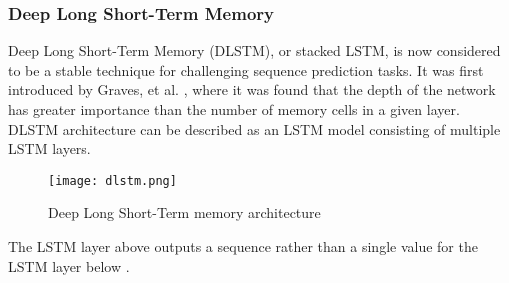 \subsubsection{Deep Long Short-Term Memory}

Deep Long Short-Term Memory (DLSTM), or stacked LSTM, is now considered to be a stable technique for challenging sequence prediction tasks. It was first introduced by Graves, et al. \cite{gravesDLSTM}, where it was found that the depth of the network has greater importance than the number of memory cells in a given layer. DLSTM architecture can be described as an LSTM model consisting of multiple LSTM layers.

\begin{figure}[H]
	\centering
    \texttt{[image: dlstm.png]}
	\caption{Deep Long Short-Term memory architecture \cite{brownleeDLSTM}}
	\label{fig:dlstm}
\end{figure}

The LSTM layer above outputs a sequence rather than a single value for the LSTM layer below \cite{brownleeDLSTM}.


